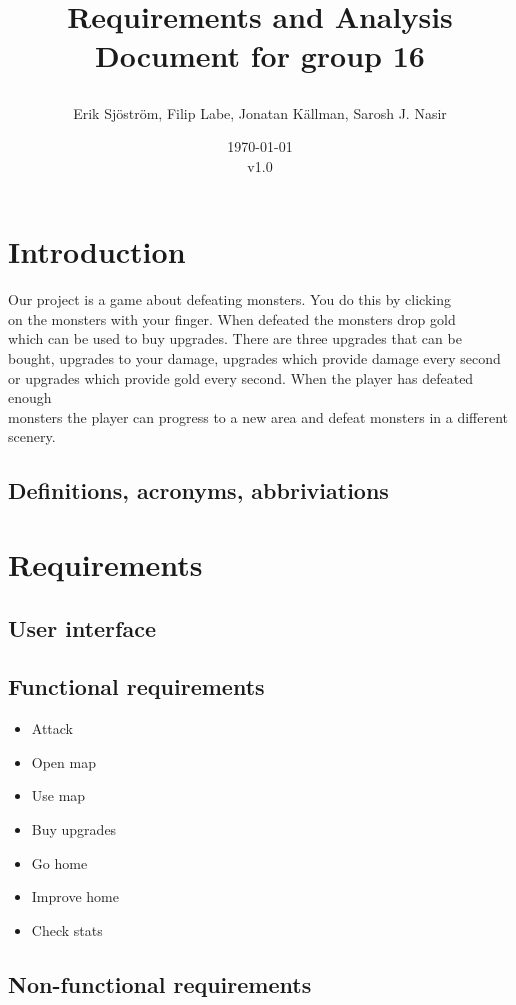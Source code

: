 \documentclass{article}
\title{
    Requirements and Analysis Document for group 16
    \author{Erik Sjöström,
            Filip Labe,
            Jonatan Källman,
            Sarosh J. Nasir}
    \date{\today \\v1.0}         
}
\begin{document}
\maketitle

\section{Introduction}
Our project is a game about defeating monsters. You do this by clicking \\
on the monsters with your finger. When defeated the monsters drop gold \\
which can be used to buy upgrades. There are three upgrades that can be \\
bought, upgrades to your damage, upgrades which provide damage every second \\
or upgrades which provide gold every second. When the player has defeated enough \\
monsters the player can progress to a new area and defeat monsters in a different \\
scenery. 

\subsection{Definitions, acronyms, abbriviations}

\section{Requirements}
\subsection{User interface}
\subsection{Functional requirements}
\begin{itemize}
    \item Attack
    \item Open map
    \item Use map
    \item Buy upgrades
    \item Go home
    \item Improve home
    \item Check stats
\end{itemize}
\subsection{Non-functional requirements}
\end{document}
